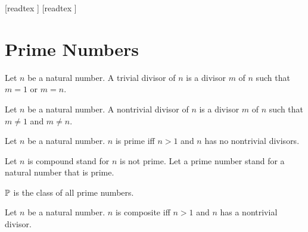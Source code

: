 \documentclass[10pt]{article}
\begin{document}
  \begin{imports}
    \begin{forthel}
      [readtex ]
      [readtex ]
    \end{forthel}
  \end{imports}


  \section{Prime Numbers}

  \begin{forthel}
    \begin{definition}
      Let $n$ be a natural number.
      A trivial divisor of $n$ is a divisor $m$ of $n$ such that $m = 1$ or
      $m = n$.
    \end{definition}
  \end{forthel}

  \begin{forthel}
    \begin{definition}
      Let $n$ be a natural number.
      A nontrivial divisor of $n$ is a divisor $m$ of $n$ such that $m \neq 1$
      and $m \neq n$.
    \end{definition}
  \end{forthel}

  \begin{forthel}
    \begin{definition}
      Let $n$ be a natural number.
      $n$ is prime iff $n > 1$ and $n$ has no nontrivial divisors.
    \end{definition}

    Let $n$ is compound stand for $n$ is not prime.
    Let a prime number stand for a natural number that is prime.
  \end{forthel}

  \begin{forthel}
    \begin{definition}
      $\mathbb{P}$ is the class of all prime numbers.
    \end{definition}
  \end{forthel}

  \begin{forthel}
    \begin{definition}
      Let $n$ be a natural number.
      $n$ is composite iff $n > 1$ and $n$ has a nontrivial divisor.
    \end{definition}
  \end{forthel}
\end{document}
